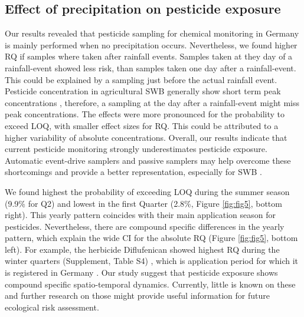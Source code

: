 \documentclass[journal=esthag,manuscript=article]{achemso}
\begin{document}
\subsection{Effect of precipitation on pesticide exposure}
Our results revealed that pesticide sampling for chemical monitoring in Germany is mainly performed when no precipitation occurs. 
Nevertheless, we found higher RQ if samples where taken after rainfall events. 
Samples taken at they day of a rainfall-event showed less risk, than samples taken one day after a rainfall-event.
This could be explained by a sampling just before the actual rainfall event.
Pesticide concentration in agricultural SWB generally show short term peak concentrations \citep{wittmer_significance_2010}, therefore, a sampling at the day after a rainfall-event might miss peak concentrations.
The effects were more pronounced for the probability to exceed LOQ, with smaller effect sizes for RQ.
This could be attributed to a higher variability of absolute concentrations.
Overall, our results indicate that current pesticide monitoring strongly underestimates pesticide exposure.
Automatic event-drive samplers \citep{stehle_probabilistic_2013} and passive samplers \citep{fernandez_calibration_2014,moschet_evaluation_2015} may help overcome these shortcomings and provide a better representation, especially for SWB \citep{lorenz_specifics_2016}. 

We found highest the probability of exceeding LOQ during the summer season (9.9\% for Q2) and lowest in the first Quarter (2.8\%, Figure \ref{fig:fig5}, bottom right).
This yearly pattern coincides with their main application season for pesticides.
Nevertheless, there are compound specific differences in the yearly pattern, which explain the wide CI for the absolute RQ (Figure \ref{fig:fig5}, bottom left).
For example, the herbicide Diflufenican showed highest RQ during the winter quarters (Supplement, Table S4) , which is application period for which it is registered in Germany \citep{bvl_online_2016}.
Our study suggest that pesticide exposure shows compound specific spatio-temporal dynamics.
Currently, little is known on these and further research on those might provide useful information for future ecological risk assessment. 
\end{document}

